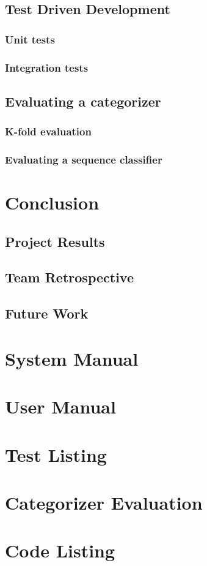 \documentclass[12pt, twoside, a4paper, draft]{report}
\begin{document}
\section{Test Driven Development}
\subsection{Unit tests}
\subsection{Integration tests}
\section{Evaluating a categorizer}
\subsection{K-fold evaluation}
\subsection{Evaluating a sequence classifier}

\chapter{Conclusion}
\section{Project Results}
\section{Team Retrospective}
\section{Future Work}

\appendix
\chapter{System Manual}
\chapter{User Manual}
\chapter{Test Listing}
\chapter{Categorizer Evaluation}
\chapter{Code Listing}
\end{document}
